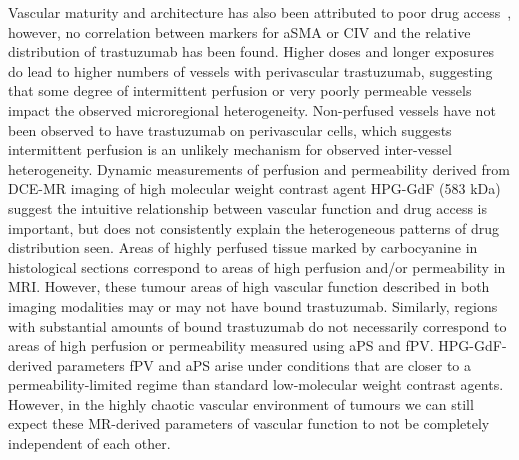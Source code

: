 Vascular maturity and architecture has also been attributed to poor drug access~\cite{Goel:2011ku}, however, no correlation between markers for aSMA or CIV and the relative distribution of trastuzumab has been found.
Higher doses and longer exposures do lead to higher numbers of vessels with perivascular trastuzumab, suggesting that some degree of intermittent perfusion or very poorly permeable vessels impact the observed microregional heterogeneity.
Non-perfused vessels have not been observed to have trastuzumab on perivascular cells, which suggests intermittent perfusion is an unlikely mechanism for observed inter-vessel heterogeneity.
Dynamic measurements of perfusion and permeability derived from DCE-MR imaging of high molecular weight contrast agent \acs{HPG-GdF} (583 kDa) suggest the intuitive relationship between vascular function and drug access is important, but does not consistently explain the heterogeneous patterns of drug distribution seen.
Areas of highly perfused tissue marked by carbocyanine in histological sections correspond to areas of high perfusion and/or permeability in MRI.
However, these tumour areas of high vascular function described in both imaging modalities may or may not have bound trastuzumab.
Similarly, regions with substantial amounts of bound trastuzumab do not necessarily correspond to areas of high perfusion or permeability measured using \acs{aPS} and \acs{fPV}.
HPG-GdF-derived parameters \acs{fPV} and \acs{aPS} arise under conditions that are closer to a permeability-limited regime than standard low-molecular weight contrast agents.
However, in the highly chaotic vascular environment of tumours we can still expect these MR-derived parameters of vascular function to not be completely independent of each other.


